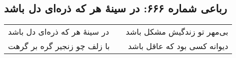 \begin{center}
\section*{رباعی شماره ۶۶۶: در سینهٔ هر که ذره‌ای دل باشد}
\label{sec:0666}
\begin{longtable}{l p{0.5cm} r}
در سینهٔ هر که ذره‌ای دل باشد
&&
بی‌مهر تو زندگیش مشکل باشد
\\
با زلف چو زنجیر گره بر گرهت
&&
دیوانه کسی بود که عاقل باشد
\\
\end{longtable}
\end{center}

